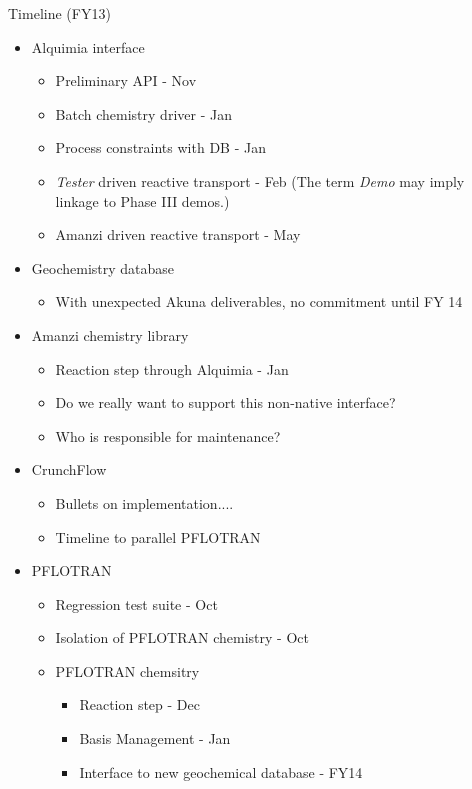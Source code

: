 \documentclass{beamer}
\newcommand{\pft}{PFLOTRAN\xspace}
\newcommand\gehcomment[1]{{{\color{orange} #1}}}
\begin{document}
\begin{frame}[allowframebreaks]{Timeline (FY13)}
\begin{itemize}
\item Alquimia interface
\begin{itemize}
\item Preliminary API - Nov
\item Batch chemistry driver - Jan
\item Process constraints with DB - Jan
\item \emph{Tester} driven reactive transport - Feb \gehcomment{(The term \emph{Demo} may imply linkage to Phase III demos.)}
\item Amanzi driven reactive transport - May
\end{itemize}
\item Geochemistry database
\begin{itemize}
\item With unexpected Akuna deliverables, no commitment until FY 14
\end{itemize}

\newpage

\item Amanzi chemistry library
\begin{itemize}
\item Reaction step through Alquimia - Jan
\item \gehcomment{Do we really want to support this non-native interface?}
\item \gehcomment{Who is responsible for maintenance?}
\end{itemize}
\item CrunchFlow
\begin{itemize}
\item Bullets on implementation....
\item Timeline to parallel \pft
\end{itemize}
\item \pft
\begin{itemize}
\item Regression test suite - Oct
\item Isolation of \pft chemistry - Oct
\item \pft chemsitry
\begin{itemize}
\item Reaction step - Dec
\item Basis Management - Jan
\item Interface to new geochemical database - FY14
\end{itemize}
\end{itemize}
\end{itemize}
\end{frame}
\end{document}
